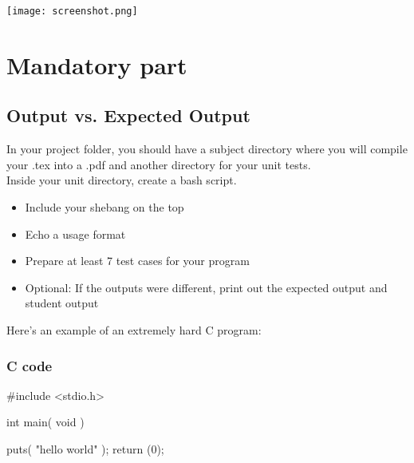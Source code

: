 \documentclass{42-en}
\begin{document}
        \begin{center}
            \texttt{[image: screenshot.png]}
        \end{center}
\chapter{Mandatory part}

  \section{Output vs. Expected Output}
    In your project folder, you should have a subject directory where you will
    compile your .tex into a .pdf and another directory for your unit tests.\\

    Inside your unit directory, create a bash script.

        \begin{itemize}\itemsep1pt
          \item Include your shebang on the top
          \item Echo a usage format
          \item Prepare at least 7 test cases for your program
          \item Optional: If the outputs were different, print out the expected output and student output\\
        \end{itemize}

  Here’s an example of an extremely hard C program:

    \subsection{C code}

      \begin{42ccode}
          #include    <stdio.h>

          int main( void ) {

            puts( "hello world" );
            return (0);
          }
    \end{42ccode}
\end{document}
